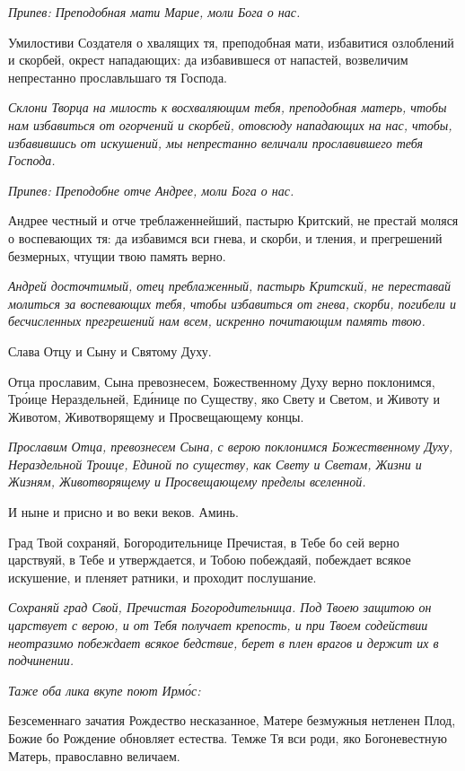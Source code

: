 \itshape Припев:\normalfont{} Преподобная мати Марие, моли Бога о нас.


Умилостиви Создателя о хвалящих тя, преподобная мати, избавитися озлоблений и скорбей, окрест нападающих: да избавившеся от напастей, возвеличим непрестанно прославльшаго тя Господа.


\itshape Склони Творца на милость к восхваляющим тебя, преподобная матерь, чтобы нам избавиться от огорчений и скорбей, отовсюду нападающих на нас, чтобы, избавившись от искушений, мы непрестанно величали прославившего тебя Господа.\normalfont{}


\itshape Припев:\normalfont{} Преподобне отче Андрее, моли Бога о нас.


Андрее честный и отче треблаженнейший, пастырю Критский, не престай моляся о воспевающих тя: да избавимся вси гнева, и скорби, и тления, и прегрешений безмерных, чтущии твою память верно.


\itshape Андрей досточтимый, отец преблаженный, пастырь Критский, не переставай молиться за воспевающих тебя, чтобы избавиться от гнева, скорби, погибели и бесчисленных прегрешений нам всем, искренно почитающим память твою.\normalfont{}


Слава Отцу и Сыну и Святому Духу.


Отца прославим, Сына превознесем, Божественному Духу верно поклонимся, Тро́ице Нераздельней, Еди́нице по Существу, яко Свету и Светом, и Животу и Животом, Животворящему и Просвещающему концы.


\itshape Прославим Отца, превознесем Сына, с верою поклонимся Божественному Духу, Нераздельной Троице, Единой по существу, как Свету и Светам, Жизни и Жизням, Животворящему и Просвещающему пределы вселенной.\normalfont{}


И ныне и присно и во веки веков. Аминь.


Град Твой сохраняй, Богородительнице Пречистая, в Тебе бо сей верно царствуяй, в Тебе и утверждается, и Тобою побеждаяй, побеждает всякое искушение, и пленяет ратники, и проходит послушание.


\itshape Сохраняй град Свой, Пречистая Богородительница. Под Твоею защитою он царствует с верою, и от Тебя получает крепость, и при Твоем содействии неотразимо побеждает всякое бедствие, берет в плен врагов и держит их в подчинении.\normalfont{}


\itshape Таже оба лика вкупе поют Ирмо́с:\normalfont{}


Безсеменнаго зачатия Рождество несказанное, Матере безмужныя нетленен Плод, Божие бо Рождение обновляет естества. Темже Тя вси роди, яко Богоневестную Матерь, православно величаем.



